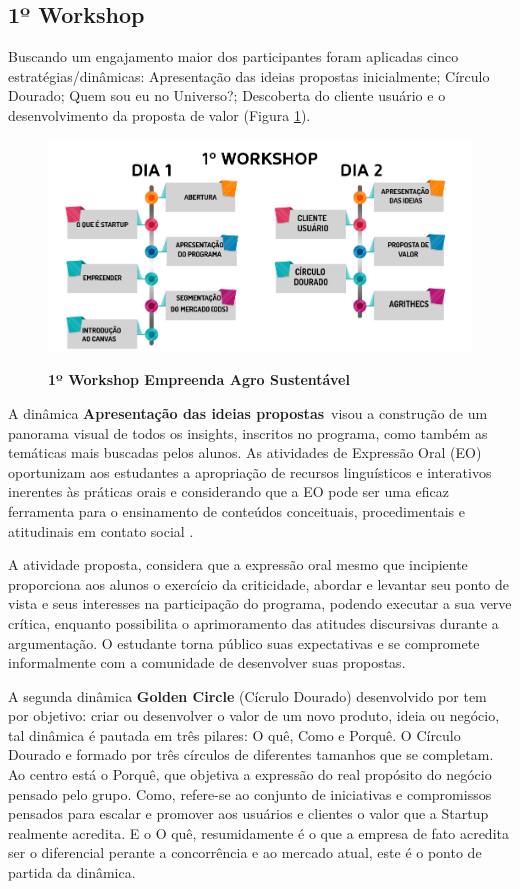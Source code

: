 \subsection{1º Workshop}

Buscando um engajamento maior dos participantes foram aplicadas cinco estratégias/dinâmicas: Apresentação das ideias propostas inicialmente; Círculo Dourado; Quem sou eu no Universo?; Descoberta do cliente usuário e o  desenvolvimento da proposta de valor (Figura \ref{figura_30}).

\begin{figure}[!h]
\centering
\caption{\textbf{1º Workshop Empreenda Agro Sustentável}}
\includegraphics[scale=0.45]{Imagens/workshop-01.png}
\label{figura_30}
\end{figure}

A dinâmica \textbf{Apresentação das ideias propostas}\ visou a construção de um panorama visual de todos os insights, inscritos no programa, como também as temáticas mais buscadas pelos alunos. As atividades de Expressão Oral (EO) oportunizam aos estudantes a apropriação de recursos linguísticos e interativos inerentes às práticas orais e considerando que a EO pode ser uma eficaz ferramenta para o ensinamento de conteúdos conceituais, procedimentais e atitudinais em contato social \cite{baltar_genero_2010}.

A atividade proposta, considera que a expressão oral mesmo que incipiente proporciona aos alunos o exercício da criticidade, abordar e levantar seu ponto de vista e seus interesses na participação do programa, podendo executar a sua verve crítica, enquanto possibilita o aprimoramento das atitudes discursivas durante a argumentação. O estudante torna público suas expectativas e se compromete informalmente com a comunidade de desenvolver suas propostas.

A segunda dinâmica \textbf{Golden Circle} (Cícrulo Dourado) desenvolvido por  tem por objetivo: criar ou desenvolver o valor de um novo produto, ideia ou negócio, tal dinâmica é pautada em três pilares: O quê, Como e Porquê. O Círculo Dourado e formado por três círculos de diferentes tamanhos que se completam. Ao centro está o Porquê, que objetiva a expressão do real propósito do negócio pensado pelo grupo. Como, refere-se ao conjunto de iniciativas e compromissos pensados para escalar e promover aos usuários e clientes o valor que a Startup realmente acredita. E o O quê, resumidamente é o que a empresa de fato acredita ser o diferencial perante a concorrência e ao mercado atual, este é o ponto de partida da dinâmica.


